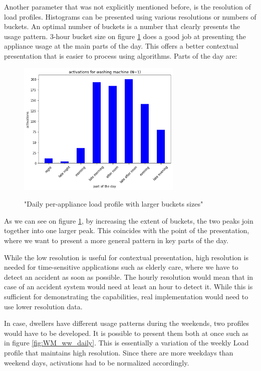 Another parameter that was not explicitly mentioned before, is the resolution of load profiles. 
Histograms can be presented using various resolutions or numbers of buckets.
An optimal number of buckets is a number that clearly presents the usage pattern. 
3-hour bucket size on figure \ref{fig:4hours} does a good job at presenting the appliance usage at the main parts of the day.
This offers a better contextual presentation that is easier to process using algorithms.
Parts of the day are:

\begin{figure}[H]
	\centering
	\caption{"Daily per-appliance load profile with larger buckets sizes"}
	\includegraphics[width=0.7\textwidth]{../Figures/LPS/3 hours.png}
	\label{fig:4hours}
\end{figure}

As we can see on figure \ref{fig:4hours}, by increasing the extent of buckets, the two peaks join together into one larger peak.
This coincides with the point of the presentation, where we want to present a more general pattern in key parts of the day.

While the low resolution is useful for contextual presentation,
high resolution is needed for time-sensitive applications such as elderly care,
where we have to detect an accident as soon as possible.
The hourly resolution would mean that in case of an accident system would need at least an hour to detect it.
While this is sufficient for demonstrating the capabilities, real implementation would need to use lower resolution data.

In case, dwellers have different usage patterns during the weekends, two profiles would have to be developed.
It is possible to present them both at once such as in figure \ref{fig:WM_ww_daily}. 
This is essentially a variation of the weekly Load profile that maintains high resolution.
Since there are more weekdays than weekend days, activations had to be normalized accordingly.

